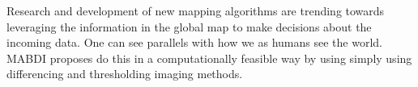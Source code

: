 Research and development of new mapping algorithms are trending towards
leveraging the information in the global map to make decisions about the
incoming data. One can see parallels with how we as humans see the world. MABDI
proposes do this in a computationally feasible way by using simply using
differencing and thresholding imaging methods.
